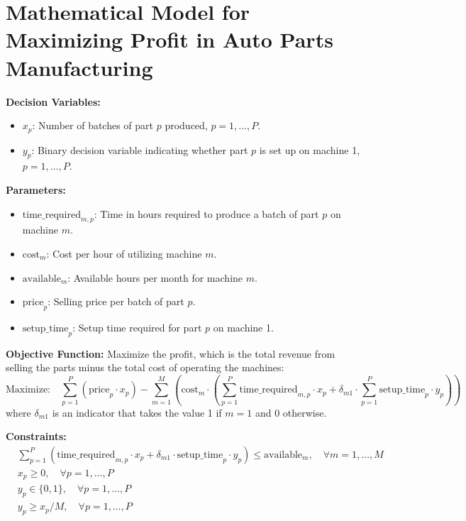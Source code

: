 \documentclass{article}
\begin{document}
\section*{Mathematical Model for Maximizing Profit in Auto Parts Manufacturing}

\textbf{Decision Variables:}
\begin{itemize}
    \item \(x_p\): Number of batches of part \(p\) produced, \(p = 1, \ldots, P\).
    \item \(y_p\): Binary decision variable indicating whether part \(p\) is set up on machine 1, \(p = 1, \ldots, P\).
\end{itemize}

\textbf{Parameters:}
\begin{itemize}
    \item \( \text{time\_required}_{m,p} \): Time in hours required to produce a batch of part \(p\) on machine \(m\).
    \item \(\text{cost}_m\): Cost per hour of utilizing machine \(m\).
    \item \(\text{available}_m\): Available hours per month for machine \(m\).
    \item \(\text{price}_p\): Selling price per batch of part \(p\).
    \item \(\text{setup\_time}_p\): Setup time required for part \(p\) on machine 1.
\end{itemize}

\textbf{Objective Function:}
Maximize the profit, which is the total revenue from selling the parts minus the total cost of operating the machines:
\[
\text{Maximize:} \quad \sum_{p=1}^{P} \left( \text{price}_p \cdot x_p \right) - \sum_{m=1}^{M} \left( \text{cost}_m \cdot \left( \sum_{p=1}^{P} \text{time\_required}_{m,p} \cdot x_p + \delta_{m1} \cdot \sum_{p=1}^{P} \text{setup\_time}_p \cdot y_p \right) \right)
\]
where \(\delta_{m1}\) is an indicator that takes the value 1 if \(m=1\) and 0 otherwise.

\textbf{Constraints:}
\begin{align*}
    & \sum_{p=1}^{P} \left( \text{time\_required}_{m,p} \cdot x_p + \delta_{m1} \cdot \text{setup\_time}_p \cdot y_p \right) \leq \text{available}_m, \quad \forall m=1, \ldots, M \\
    & x_p \geq 0, \quad \forall p=1, \ldots, P \\
    & y_p \in \{0, 1\}, \quad \forall p=1, \ldots, P \\
    & y_p \geq x_p / M, \quad \forall p=1, \ldots, P
\end{align*}
\end{document}
